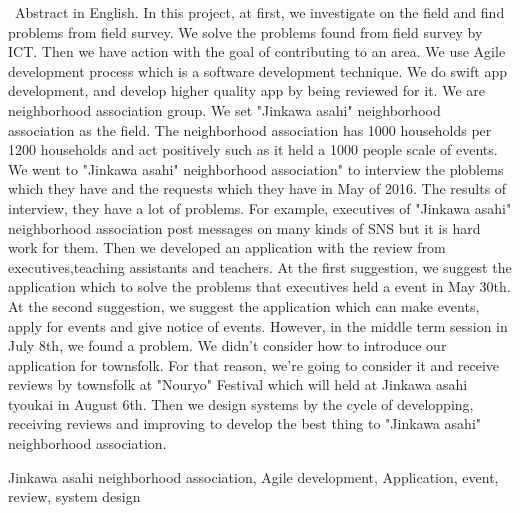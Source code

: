 \begin{eabstract} 
\ Abstract in English. In this project, at first, we investigate on the field and find problems from field survey. We solve the problems found from field survey by ICT. Then we have action with the goal of contributing to an area. We use Agile development process which is a software development technique. We do swift app development, and develop higher quality app by being reviewed for it.
We are neighborhood association group. We set "Jinkawa asahi" neighborhood association as the field.
The neighborhood association has 1000 households per 1200 households and act positively such as it held a 1000 people scale of events. We went to "Jinkawa asahi" neighborhood association" to interview the ploblems which they have and the requests which they have in May of 2016. The results of interview, they have a lot of problems. For example, executives of "Jinkawa asahi" neighborhood association post messages on many kinds of SNS but it is hard work for them. Then we developed an application with the review from executives,teaching assistants and teachers. At the first suggestion, we suggest the application which to solve the problems that executives held a event in May 30th. At the second suggestion, we suggest the application which can make events, apply for events and give notice of events. However, in the middle term session in July 8th, we found a problem. We didn't consider how to introduce our application for townsfolk. For that reason, we're going to consider it and receive reviews by townsfolk at "Nouryo" Festival which will held at Jinkawa asahi tyoukai in August 6th. Then we design systems by the cycle of developping, receiving reviews and improving to develop the best thing to "Jinkawa asahi" neighborhood association.
\begin{ekeyword}
Jinkawa asahi neighborhood association, Agile development, Application, event, review, system design
\end{ekeyword}
\end{eabstract}
